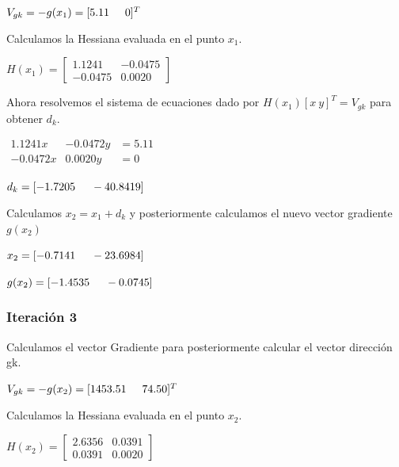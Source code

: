\documentclass[12pt]{article}
\begin{document}
	\begin{center}
		$V_{gk}=-g(x_1)=[5.11 \hspace{0.5cm} 0]^T$			
	\end{center}
	
	Calculamos la Hessiana evaluada en el punto $x_1$.
	
	\begin{center}
		$H(x_1)=\left[\begin{array}{cc}
			1.1241   & -0.0475\\
			-0.0475  & 0.0020
		\end{array}\right]$		
	\end{center}
	
	Ahora resolvemos el sistema de ecuaciones dado por $H(x_1)[x\ y]^T=V_{gk}$ para obtener $d_k$.
	
	\begin{center}
		$\begin{array}{ccc}
			1.1241x & -0.0472y & =5.11\\
			-0.0472x & 0.0020y & =0
		\end{array}$
		
		$d_k=[-1.7205\hspace{0.5cm} -40.8419]$
	\end{center}	
	
	Calculamos $x_2=x_1+d_k$ y posteriormente calculamos el nuevo vector gradiente $g(x_2)$
	
	\begin{center}
		$x_2=[-0.7141\hspace{0.5cm}-23.6984]$
		
		$g(x_2)=[-1.4535\hspace{0.5cm}-0.0745]$
	\end{center}

    \subsubsection*{Iteración 3}
	
	Calculamos el vector Gradiente para posteriormente calcular el vector dirección gk.
	
	\begin{center}
		$V_{gk}=-g(x_2)=[1453.51 \hspace{0.5cm} 74.50]^T$			
	\end{center}
	
	Calculamos la Hessiana evaluada en el punto $x_2$.
	
	\begin{center}
		$H(x_2)=\left[\begin{array}{cc}
			2.6356   & 0.0391\\
			0.0391   & 0.0020
		\end{array}\right]$		
	\end{center}
	
\end{document}
